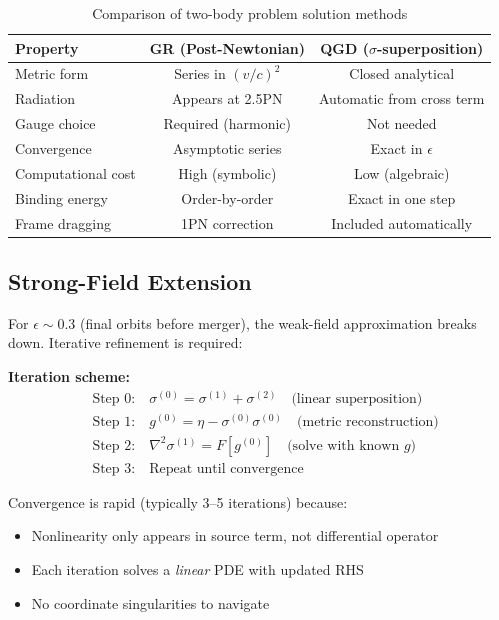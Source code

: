 \documentclass[11pt,a4paper]{article}
\theoremstyle{definition}
\theoremstyle{remark}
\begin{document}
	\begin{table}[h]
		\centering
		\caption{Comparison of two-body problem solution methods}
		\label{tab:two_body_comparison}
		\begin{tabular}{lcc}
			\toprule
			Property & GR (Post-Newtonian) & QGD ($\sigma$-superposition) \\
			\midrule
			Metric form & Series in $(v/c)^2$ & Closed analytical \\
			Radiation & Appears at 2.5PN & Automatic from cross term \\
			Gauge choice & Required (harmonic) & Not needed \\
			Convergence & Asymptotic series & Exact in $\epsilon$ \\
			Computational cost & High (symbolic) & Low (algebraic) \\
			Binding energy & Order-by-order & Exact in one step \\
			Frame dragging & 1PN correction & Included automatically \\
			\bottomrule
		\end{tabular}
	\end{table}
	
	\subsection{Strong-Field Extension}
	
	For $\epsilon \sim 0.3$ (final orbits before merger), the weak-field approximation breaks down. Iterative refinement is required:
	
	\textbf{Iteration scheme:}
	\begin{align}
		&\text{Step 0:} \quad \sigma^{(0)} = \sigma^{(1)} + \sigma^{(2)} \quad \text{(linear superposition)} \\
		&\text{Step 1:} \quad g^{(0)} = \eta - \sigma^{(0)}\sigma^{(0)} \quad \text{(metric reconstruction)} \\
		&\text{Step 2:} \quad \nabla^2\sigma^{(1)} = F[g^{(0)}] \quad \text{(solve with known } g) \\
		&\text{Step 3:} \quad \text{Repeat until convergence}
	\end{align}
	
	Convergence is rapid (typically 3--5 iterations) because:
	\begin{itemize}
		\item Nonlinearity only appears in source term, not differential operator
		\item Each iteration solves a \emph{linear} PDE with updated RHS
		\item No coordinate singularities to navigate
	\end{itemize}
	
\end{document}
